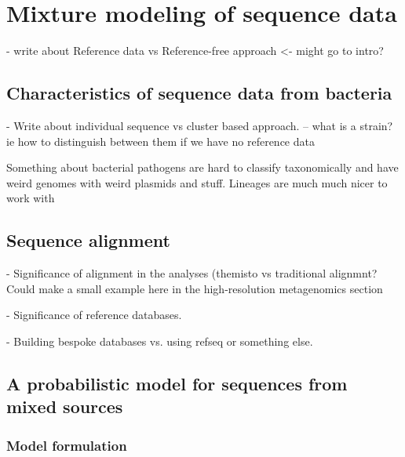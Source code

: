 \documentclass[officiallayout]{tktla}
\begin{document}
\chapter{Mixture modeling of sequence data}

- write about Reference data vs Reference-free approach <- might go to intro?

\section{Characteristics of sequence data from bacteria}

- Write about individual sequence vs cluster based approach.
-- what is a strain? ie how to distinguish between them if we have no reference data

Something about bacterial pathogens are hard to classify taxonomically
and have weird genomes with weird plasmids and stuff.  Lineages are
much much nicer to work with

\section{Sequence alignment}

- Significance of alignment in the analyses (themisto vs traditional alignmnt? Could make a small example here in the high-resolution metagenomics section

- Significance of reference databases.

- Building bespoke databases vs. using refseq or something else.

\section{A probabilistic model for sequences from mixed sources}

\subsection{Model formulation}
\end{document}
